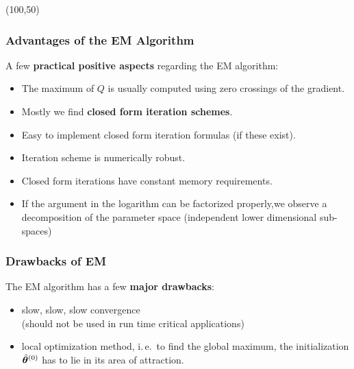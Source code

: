   \begin{centernss}
    \begin{struktogramm}(100,50)
      \untilend
    \end{struktogramm}
  \end{centernss}
\subsubsection{Advantages of the EM Algorithm}
 A few   \textbf{practical positive aspects} regarding the EM algorithm:

  \begin{itemize}
    \item The maximum of $Q$ is usually computed using zero crossings of the gradient.      
    \item Mostly we find   \textbf{closed form iteration schemes}.      
    \item Easy to implement closed form iteration formulas (if these exist).      
    \item Iteration scheme is numerically robust.      
    \item Closed form iterations have constant memory requirements.      
    \item If the argument in the logarithm can be factorized properly,we observe a decomposition of the parameter space       (independent lower dimensional sub-spaces)
  \end{itemize}

\subsubsection{Drawbacks of EM}

  The EM algorithm has a few   \textbf{major drawbacks}:  
  \begin{itemize}
    \item slow, slow, slow convergence \\
      (should not be used in run time critical applications)   
    \item local optimization method, i.\,e.\ to find the global maximum, the initialization $\hat{\bm{\theta}}^{(0)}$ has to lie in its area of attraction.
  \end{itemize}
  

